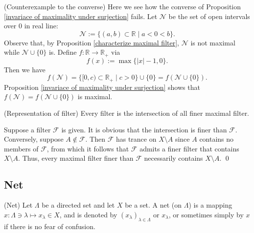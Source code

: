 \documentclass{report}
\begin{document}
\begin{ex} (Counterexample to the converse)
    Here we see how the converse of Proposition \ref{invariace of maximality under surjection} fails. Let \( \mathscr{N} \) be the set of open intervals over 0 in real line:
    \[
        \mathscr{N} := \{(a,b) \subset \mathbb{R} \mid a<0<b\}.
    \]
    Observe that, by Proposition \ref{characterize maximal filter}, \( \mathscr{N} \) is not maximal while \( \mathscr{N}\cup \{0\} \) is.
    Define \( f:\mathbb{R}\to \mathbb{R}_+ \) via
    \[
        f(x):=\max \{|x|-1,0\}.
    \]
    Then we have
    \[
        f(\mathscr{N}) =\{[0,c) \subset \mathbb{R}_+ \mid c>0\} \cup \{0\} = f(\mathscr{N}\cup \{0\}).
    \]
    Proposition \ref{invariace of maximality under surjection} shows that \( f(\mathscr{N}) = f(\mathscr{N}\cup \{0\}) \) is maximal.
\end{ex}

\begin{prp} (Representation of filter)
    Every filter is the intersection of all finer maximal filter.
\end{prp}
\begin{prf}
    Suppose a filter \( \mathscr{F} \) is given. It is obvious that the intersection is finer than \( \mathscr{F} \). Conversely, suppose \( A \notin \mathscr{F}\). Then \( \mathscr{F} \) has trance on \( X \setminus A \) since \( A \) contains no members of \( \mathscr{F} \), from which it follows that \( \mathscr{F} \) admits a finer filter that contains \( X \setminus A \). Thus, every maximal filter finer than \( \mathscr{F} \) necessarily contains \( X \setminus A \).
    \qed\end{prf}


\subsection{Net}
\begin{dfn} (Net)
    Let \( \Lambda \) be a directed set and let \( X \) be a set.
    A net (on \( \Lambda \)) is a mapping \( x: \Lambda \ni \lambda \mapsto x_{\lambda}\in X \), and is denoted by \( (x_{\lambda})_{\lambda \in \Lambda} \) or \( x_{\lambda} \), or sometimes simply by \( x \) if there is no fear of confusion.
\end{dfn}
\end{document}
